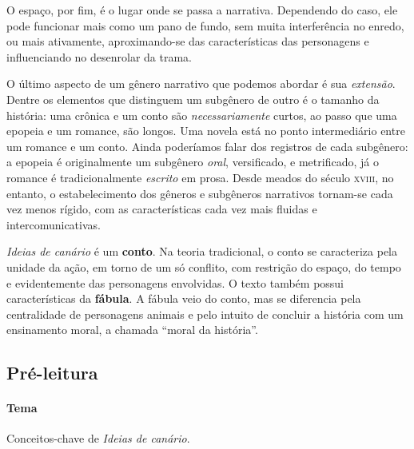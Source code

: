 \documentclass[11pt]{extarticle}
\begin{document}
O espaço, por fim, é o lugar onde se passa a narrativa. Dependendo do caso, ele pode funcionar mais como um pano de fundo, sem muita interferência no enredo, ou mais ativamente, aproximando-se das características das personagens e influenciando no desenrolar da trama. 


O último aspecto de um gênero narrativo que podemos abordar é sua \textit{extensão}. Dentre os elementos que distinguem um subgênero de outro é o tamanho da história: uma crônica e um conto são \textit{necessariamente} curtos, ao passo que uma epopeia e um romance, são longos. Uma novela está no ponto intermediário entre um romance e um conto. Ainda poderíamos falar dos registros de cada subgênero: a epopeia é originalmente um subgênero \textit{oral}, versificado, e metrificado, já o romance é tradicionalmente \textit{escrito} em prosa.  Desde meados do século \textsc{xviii}, no entanto, o estabelecimento dos gêneros e subgêneros narrativos tornam-se cada vez menos rígido, com as características cada vez mais fluidas e intercomunicativas.

\textit{Ideias de canário} é um \textbf{conto}. Na teoria tradicional, o conto se caracteriza pela unidade da ação, em torno de um só conflito, com restrição do espaço, do tempo e evidentemente das personagens envolvidas. O texto também possui características da \textbf{fábula}. A fábula veio do conto, mas se diferencia pela centralidade de personagens animais e pelo intuito de concluir a história com um ensinamento moral, a chamada ``moral da história''.

\subsection{Pré-leitura}


\paragraph{Tema} Conceitos-chave de \textit{Ideias de canário}.
\end{document}
